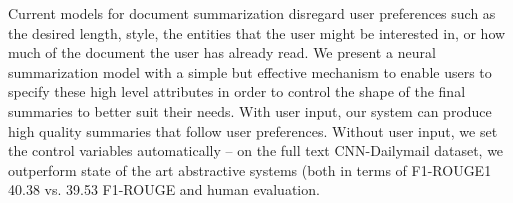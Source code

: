 Current models for document summarization disregard user preferences such as the desired length, style, the entities that the user might be interested in, or how much of the document the user has already read. We present a neural summarization model with a simple but effective mechanism to enable users to specify these high level attributes in order to control the shape of the final summaries to better suit their needs. With user input, our system can produce high quality summaries that follow user preferences. Without user input, we set the control variables automatically -- on the full text CNN-Dailymail dataset, we outperform state of the art abstractive systems (both in terms of F1-ROUGE1 40.38 vs. 39.53 F1-ROUGE and human evaluation.
